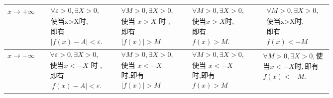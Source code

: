 \documentclass[12pt, a4paper, oneside, UTF8]{ctexbook}
\begin{document}
\begin{sloppypar}
\begin{center}
\begin{supertabular}{|c|c|c|c|c|}
            $x \to + \infty $ & $\begin{aligned}&\forall\varepsilon>0,\exists X>0, \\&\text{使当x>X时,} \\&\text{即有} \\&|f(x)-A|<\varepsilon.\end{aligned} $                                   & $\begin{aligned}&\forall M>0,\exists X>0, \\&\text{使当 }x>X\text{ 时 }, \\&\text{即有}\\& |f(x)|>M\end{aligned}$                            & $\begin{aligned}&\forall M>0,\exists X>0,\\&\text{使当}x>X\text{时},\\&\text{即有}\\&f(x)>M.\end{aligned}$                        & $\begin{aligned}&\forall M>0,\exists X>0, \\&\text{使当x>X时,} \\&\text{即有}\\&f(x)<-M\end{aligned}$                                 \\ \hline
            $x \to -\infty$   & $\begin{aligned}&\forall\varepsilon>0,\exists X>0, \\&\text{使当}x<-X\text{ 时 }, \\&\text{即有} \\&|f(x)-A|<\varepsilon.\end{aligned}$                          & $\begin{aligned} & \forall M>0 , \exists X> 0,\\&\text{使当 }x<-X \\&\text{时,即有}\\&|f(x)|>M\end{aligned}$                                 & $\begin{aligned} &\forall M>0,\exists X> 0,\\&\text{使当 }x<-X \\&\text{时,即有}\\&f(x)>M\end{aligned}$                           & $\begin{aligned}&\forall M>0,\exists X>0,\text{使}\\&\text{当}x<-X\text{时},\text{即有}\\&f(x)< -M.\end{aligned}$                     \\ \hline

\end{supertabular}
\end{center}
\end{sloppypar}
\end{document}

